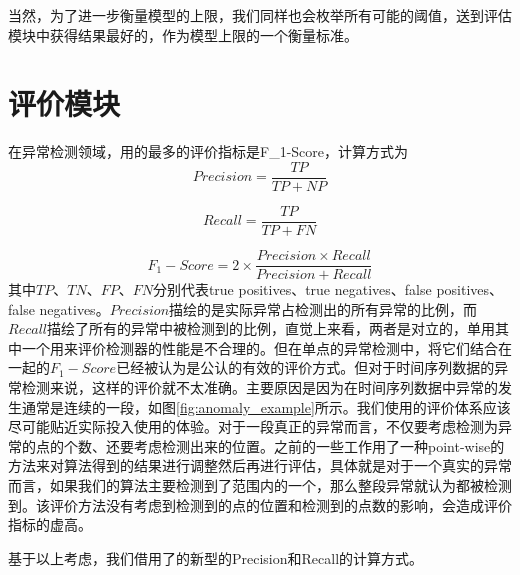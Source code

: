 当然，为了进一步衡量模型的上限，我们同样也会枚举所有可能的阈值，送到评估模块中获得结果最好的，作为模型上限的一个衡量标准。

\section{评价模块}
在异常检测领域，用的最多的评价指标是F\_1-Score，计算方式为
\begin{equation}
  Precision = \frac{TP}{TP + NP}
\end{equation}

\begin{equation}
  Recall = \frac{TP}{TP + FN}
\end{equation}

\begin{equation}
  F_1-Score = 2\times \frac { Precision \times Recall}{Precision + Recall}
\end{equation}
其中$TP、TN、FP、FN$分别代表true positives、true negatives、false positives、false negatives。$Precision$描绘的是实际异常占检测出的所有异常的比例，而$Recall$描绘了所有的异常中被检测到的比例，直觉上来看，两者是对立的，单用其中一个用来评价检测器的性能是不合理的。但在单点的异常检测中，将它们结合在一起的$F_1-Score$已经被认为是公认的有效的评价方式。但对于时间序列数据的异常检测来说，这样的评价就不太准确。主要原因是因为在时间序列数据中异常的发生通常是连续的一段，如图\ref{fig:anomaly_example}所示。我们使用的评价体系应该尽可能贴近实际投入使用的体验。对于一段真正的异常而言，不仅要考虑检测为异常的点的个数、还要考虑检测出来的位置。之前的一些工作\cite{xu2018unsupervised}\cite{su2019robust}用了一种point-wise的方法来对算法得到的结果进行调整然后再进行评估，具体就是对于一个真实的异常而言，如果我们的算法主要检测到了范围内的一个，那么整段异常就认为都被检测到。该评价方法没有考虑到检测到的点的位置和检测到的点数的影响，会造成评价指标的虚高。

基于以上考虑，我们借用了\cite{tatbul2018precision}的新型的Precision和Recall的计算方式。

